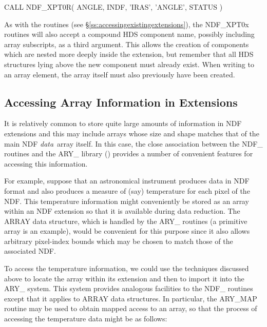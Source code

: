 \documentclass[twoside,11pt,nolof]{starlink}
\providecommand{\st}[1]{{\emph{#1}}}
\begin{document}
\small
\begin{terminalv}
      CALL NDF_XPT0R( ANGLE, INDF, 'IRAS', 'ANGLE', STATUS )
\end{terminalv}
\normalsize

As with the  routines (see
\S\ref{ss:accessingexistingextensions}), the NDF\_XPT0x routines will
also accept a compound HDS component name, possibly including array
subscripts, as a third argument. This allows the creation of
components which are nested more deeply inside the extension, but
remember that all HDS structures lying above the new component must
already exist.  When writing to an array element, the array itself
must also previously have been created.

\subsection{\label{ss:extnarrays}Accessing Array Information in Extensions}

It is relatively common to store quite large amounts of information in NDF
extensions and this may include arrays whose size and shape matches that of the
main NDF \st{data}\ array itself. In this case, the close association between
the NDF\_ routines and the ARY\_ library ()
provides a number of convenient features for accessing this
information.

For example, suppose that an astronomical instrument produces data in
NDF format and also produces a measure of (say) temperature for each
pixel of the NDF. This temperature information might conveniently be
stored as an array within an NDF extension so that it is available
during data reduction. The ARRAY data structure, which is handled by
the ARY\_ routines (a primitive  array is an
example), would be convenient for this purpose since it also allows
arbitrary pixel-index bounds which may be chosen to match those of the
associated NDF.

To access the temperature information, we could use the techniques discussed
above to locate the array within its extension and then to import it into the
ARY\_ system. This system provides analogous facilities to the NDF\_ routines
except that it applies to ARRAY data structures. In particular, the ARY\_MAP
routine may be used to obtain mapped access to an array, so that the process of
accessing the temperature data might be as follows:
\end{document}
